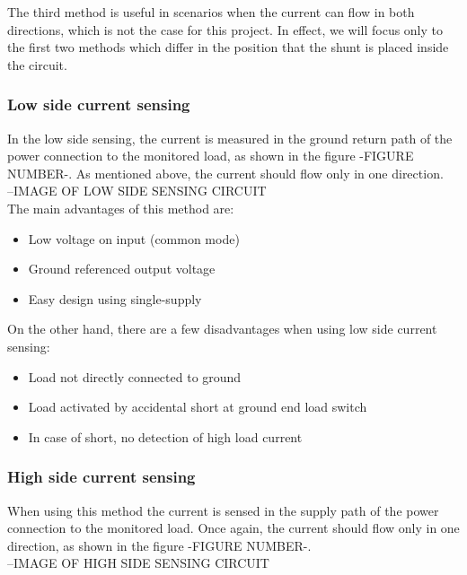 The third method is useful in scenarios when the current can flow in both directions, which is not the case for this project. In effect, we will focus only to the first two methods which differ in the position that the shunt is placed inside the circuit. 

\subsubsection{Low side current sensing}
In the low side sensing, the current is measured in the ground return path of the power connection to the monitored load, as shown in the figure -FIGURE NUMBER-. As mentioned above, the current should flow only in one direction.\\

--IMAGE OF LOW SIDE SENSING CIRCUIT\\

The main advantages of this method are:

\begin{itemize}
    \item Low voltage on input (common mode)
    \item Ground referenced output voltage
    \item Easy design using single-supply
\end{itemize}

On the other hand, there are a few disadvantages when using low side current sensing:

\begin{itemize}
    \item Load not directly connected to ground
    \item Load activated by accidental short at ground end load switch
    \item In case of short, no detection of high load current
\end{itemize}

\subsubsection{High side current sensing}
When using this method the current is sensed in the supply path of the power connection to the monitored load. Once again, the current should flow only in one direction, as shown in the figure -FIGURE NUMBER-.\\

--IMAGE OF HIGH SIDE SENSING CIRCUIT\\

